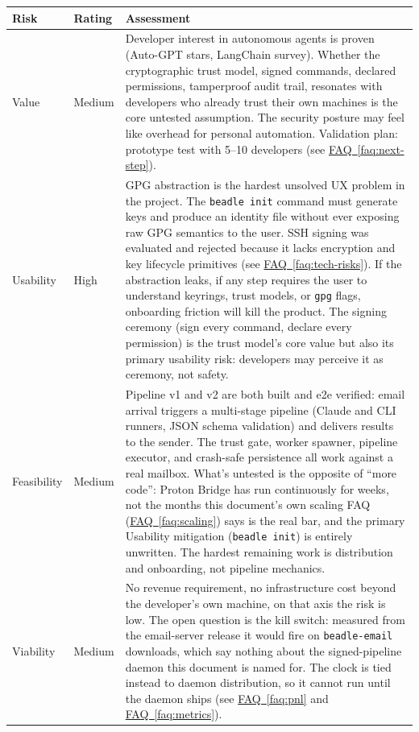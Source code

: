 \documentclass[11pt,letterpaper]{article}
\newcommand{\faqref}[1]{\hyperref[#1]{FAQ~\ref*{#1}}}
\begin{document}
\renewcommand{\arraystretch}{1.6}
\begin{tabularx}{\textwidth}{@{} l l X @{}}
\toprule
\textbf{\color{SectionBlue}Risk} & \textbf{\color{SectionBlue}Rating} & \textbf{\color{SectionBlue}Assessment} \\
\midrule
Value & \textcolor{RiskAmber}{Medium} &
  Developer interest in autonomous agents is proven (Auto-GPT stars,
  LangChain survey). Whether the cryptographic trust model, signed commands,
  declared permissions, tamperproof audit trail, resonates with developers
  who already trust their own machines is the core untested assumption.
  The security posture may feel like overhead for personal automation.
  Validation plan: prototype test with 5--10 developers
  (see \faqref{faq:next-step}). \\
Usability & \textcolor{RiskRed}{High} &
  GPG abstraction is the hardest unsolved UX problem in the project. The
  {\small\texttt{beadle init}} command must generate keys and produce an
  identity file without ever exposing raw GPG semantics to the user. SSH
  signing was evaluated and rejected because it lacks encryption and key
  lifecycle primitives (see \faqref{faq:tech-risks}). If the abstraction
  leaks, if any step requires the user to understand keyrings, trust
  models, or \texttt{gpg} flags, onboarding friction will kill the
  product. The signing ceremony (sign every command, declare every
  permission) is the trust model's core value but also its primary
  usability risk: developers may perceive it as ceremony, not safety. \\
Feasibility & \textcolor{RiskAmber}{Medium} &
  Pipeline v1 and v2 are both built and e2e verified: email arrival
  triggers a multi-stage pipeline (Claude and CLI runners, JSON schema
  validation) and delivers results to the sender. The trust gate, worker
  spawner, pipeline executor, and crash-safe persistence all work against
  a real mailbox. What's untested is the opposite of ``more code'':
  Proton Bridge has run continuously for weeks, not the months this
  document's own scaling FAQ (\faqref{faq:scaling}) says is the real bar,
  and the primary Usability mitigation ({\small\texttt{beadle init}}) is
  entirely unwritten. The hardest remaining work is distribution and
  onboarding, not pipeline mechanics. \\
Viability & \textcolor{RiskAmber}{Medium} &
  No revenue requirement, no infrastructure cost beyond the developer's
  own machine, on that axis the risk is low. The open question is the kill
  switch: measured from the email-server release it would fire on
  \texttt{beadle-email} downloads, which say nothing about the
  signed-pipeline daemon this document is named for. The clock is tied
  instead to daemon distribution, so it cannot run until the daemon ships
  (see \faqref{faq:pnl} and \faqref{faq:metrics}). \\
\bottomrule
\end{tabularx}
\renewcommand{\arraystretch}{1.0}
\end{document}
